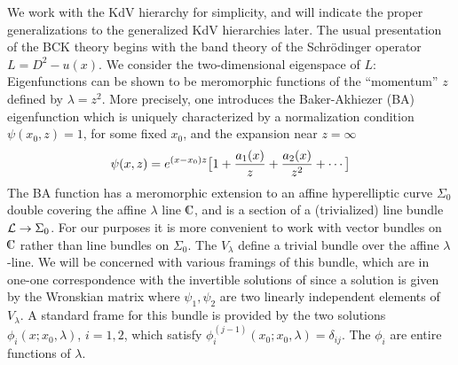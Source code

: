 We work with the KdV hierarchy 
for simplicity, and will indicate the proper generalizations 
to the generalized KdV hierarchies later. The usual presentation 
of the BCK theory begins with the band theory of the 
Schr\"odinger operator $L=D^2-u(x)$. We consider the two-dimensional
eigenspace of $L$:
\eqn{}
Eigenfunctions can be shown to be meromorphic functions of the 
``momentum'' $z$ defined by $\lambda=z^2$. More precisely,
one introduces 
the Baker-Akhiezer (BA) eigenfunction 
which is uniquely characterized by 
a normalization condition $\psi(x_0,z)=1$, for some fixed
$x_0$, and the expansion near $z=\infty$
$$\psi(x,z)=e^{(x-x_0)z}\bigl[1 + {a_1(x)\over z} + {a_2(x)\over z^2}
+\cdots \bigr] $$ 
The BA function has a meromorphic extension to an affine hyperelliptic
curve $\Sigma_0$ double covering the affine $\lambda$ line $\IC$, and 
is a section of a (trivialized) line bundle ${\cal L}\to\Sigma_0$. 
For our purposes it is more convenient to work with vector bundles on 
$\IC$ rather than line bundles on
$\Sigma_0$. 
The $V_\lambda$ define a trivial bundle over the affine 
$\lambda$-line. We will be concerned with 
various framings of this bundle, which are in one-one
correspondence with the invertible solutions of
\eqn{}
since a solution is given by the Wronskian matrix
\eqn{}
where $\psi_1,\psi_2$ are two linearly independent elements of $V_\lambda$.
A standard frame for this bundle is provided by the 
two solutions $\phi_{i}(x;x_0,\lambda)$, $i=1,2$, which satisfy
$\phi_{i}^{(j-1)}(x_0;x_0,\lambda)=\delta_{ij}$. The
$\phi_i$ are entire functions of $\lambda$.

